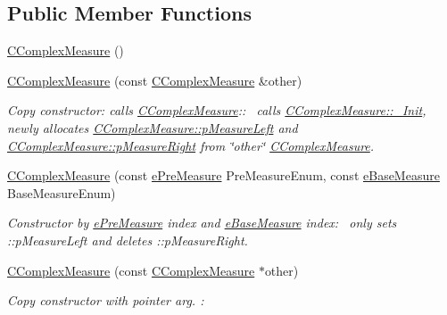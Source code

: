 \subsection*{Public Member Functions}
\begin{DoxyCompactItemize}
\item 
\hyperlink{classCComplexMeasure_a5501594d4a8efdf565aa4c6bc6ce0379}{C\+Complex\+Measure} ()
\item 
\hyperlink{classCComplexMeasure_a50de70ddcb4b2b64c238d686e2f85419}{C\+Complex\+Measure} (const \hyperlink{classCComplexMeasure}{C\+Complex\+Measure} \&other)
\begin{DoxyCompactList}\small\item\em Copy constructor\+: calls \hyperlink{classCComplexMeasure}{C\+Complex\+Measure}\+:\+:~\newline
 calls \hyperlink{classCComplexMeasure_aed6efc43efe99d8cf1072ac98ec8d21c}{C\+Complex\+Measure\+::\+\_\+\+Init}, newly allocates \hyperlink{classCComplexMeasure_a4d68f86891a036df81f5b1a344c36f27}{C\+Complex\+Measure\+::p\+Measure\+Left} and \hyperlink{classCComplexMeasure_abbafc4b16676d223ed34860b8ece1b6b}{C\+Complex\+Measure\+::p\+Measure\+Right} from \char`\"{}other\char`\"{} \hyperlink{classCComplexMeasure}{C\+Complex\+Measure}. \end{DoxyCompactList}\item 
\hyperlink{classCComplexMeasure_a0a0946c508c95e4baf22a0bd5831c1b8}{C\+Complex\+Measure} (const \hyperlink{PreMeasure_8h_a6c81167b8d4c2badde42f81cb7214620}{e\+Pre\+Measure} Pre\+Measure\+Enum, const \hyperlink{BaseMeasure_8h_ac90e5164ccf1f0d648fba7e94b229a11}{e\+Base\+Measure} Base\+Measure\+Enum)
\begin{DoxyCompactList}\small\item\em Constructor by \hyperlink{PreMeasure_8h_a6c81167b8d4c2badde42f81cb7214620}{e\+Pre\+Measure} index and \hyperlink{BaseMeasure_8h_ac90e5164ccf1f0d648fba7e94b229a11}{e\+Base\+Measure} index\+:~\newline
 only sets \+::p\+Measure\+Left and deletes \+::p\+Measure\+Right. \end{DoxyCompactList}\item 
\hyperlink{classCComplexMeasure_a876e7030b4576f59ab66793ed3e7b50e}{C\+Complex\+Measure} (const \hyperlink{classCComplexMeasure}{C\+Complex\+Measure} $\ast$other)
\begin{DoxyCompactList}\small\item\em Copy constructor with pointer arg. \+: ~\newline

\end{DoxyCompactList}
\end{DoxyCompactItemize}
